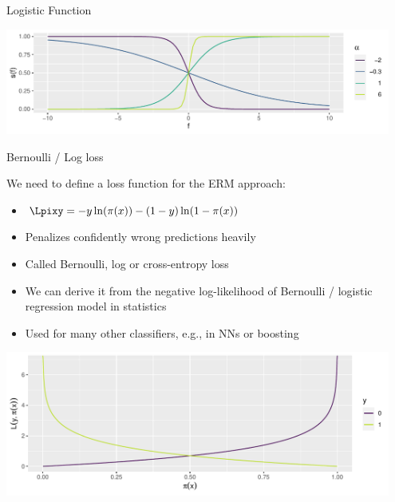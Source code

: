 \documentclass[11pt,compress,t,notes=noshow, xcolor=table]{beamer}
\newenvironment{knitrout}{}{} %
\begin{document}
\begin{vbframe}{Logistic Function}
\begin{knitrout}
{\centering \includegraphics[width=0.95\textwidth]{figure/reg_class_log_3} 

}



\end{knitrout}

\end{vbframe}

\begin{vbframe}{Bernoulli / Log loss}

We need to define a loss function for the ERM approach:

\begin{itemize}
  \item $\Lpixy = -y\ln(\pix)-(1-y)\ln(1-\pix)$
  \item Penalizes confidently wrong predictions heavily
  \item Called Bernoulli, log or cross-entropy loss 
  \item We can derive it from the negative log-likelihood of Bernoulli / logistic regression model in statistics
  \item Used for many other classifiers, e.g., in NNs or boosting 
\end{itemize}


\begin{knitrout}\scriptsize
{}\color{fgcolor}

{\centering \includegraphics[width=0.95\textwidth]{figure/reg_class_log_4}  

}



\end{knitrout}

\end{vbframe}
\end{document}
